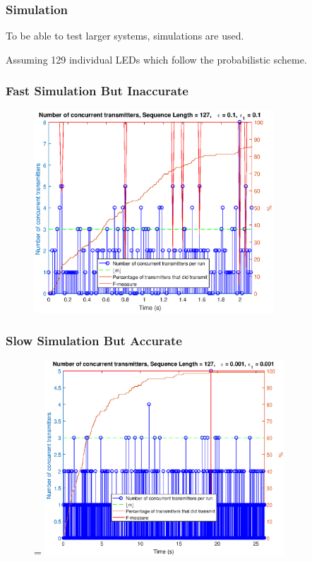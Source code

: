 \documentclass{beamer}
\begin{document}
	\begin{frame}\frametitle{Simulation}
		
		To be able to test larger systems, simulations are used.

		Assuming 129 individual LEDs which follow the probabilistic scheme.

	\end{frame}



	\begin{frame}\frametitle{Fast Simulation But Inaccurate}
		
		\begin{figure}[t]
			\centering
			\includegraphics[width=0.8\textwidth]{simulation-1.eps}
		\end{figure}

	\end{frame}

	\begin{frame}\frametitle{Slow Simulation But Accurate}
		
		\begin{figure}[t]=
			\centering
			\includegraphics[width=0.8\textwidth]{simulation-2.eps}
		\end{figure}

	\end{frame}
\end{document}

